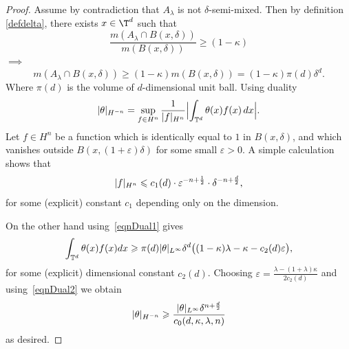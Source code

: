 \documentclass[12pt]{report}   %
\renewcommand{\leq}{\leqslant}
\renewcommand{\geq}{\geqslant}
\numberwithin{equation}{section}
\theoremstyle{plain}
\theoremstyle{definition}
\theoremstyle{remark}
\DeclarePairedDelimiter{\abs}{\lvert}{\rvert}
\DeclarePairedDelimiter{\norm}{|}{|}
\DeclarePairedDelimiter{\paren}{(}{)}
\newcommand{\eps}{{\varepsilon}}
\begin{document}
 \begin{proof}%
    Assume by contradiction that $A_\lambda$ is not $\delta$-semi-mixed.
    Then by definition \ref{defdelta}, there exists $x \in \T^d$ such that
     \[
          \frac{m(A_\lambda \cap B(x,\delta))}{m(B(x,\delta))}
    	\geq (1-\kappa) 
     \]
    $ \implies$
    \begin{equation}\label{eqnDual1}
      m(A_\lambda \cap B(x,\delta))
	\geq (1-\kappa) m(B(x,\delta))
	=(1-\kappa)\pi(d) \delta^d.
    \end{equation}
    Where $\pi(d)$ is the volume of $d$-dimensional unit ball.
Using duality
    \begin{equation}\label{eqnDual2}
      \norm{\theta}_{H^{-n}}
	= \sup_{f\in H^{n}} \frac{1}{\norm{f}_{H^{n}} } \abs[\Big]{\int_{\mathbb{T}^d} \theta(x)f(x) \, dx }.
    \end{equation}
    Let $f \in H^{n}$  be a function which is identically equal to $1$ in $B(x,\delta)$, and which vanishes outside $B(x,(1+\eps)\delta)$ for some small $\eps > 0$.
    A simple calculation shows that 
    \[
      \norm{f}_{H^{n}}\leq c_1(d)\cdot \eps^{-n + \frac{1}{2}}\cdot \delta^{-n + \frac{d}{2}},
    \]
    for some (explicit) constant $c_1$ depending only on the dimension.

    On the other hand using~\eqref{eqnDual1} gives
    \begin{equation}\label{eq:kap}
      \int_{\mathbb{T}^d}\theta(x) f(x) dx
	\geq \pi(d) \norm{\theta}_{L^\infty} \delta^d \paren[\big]{ (1-\kappa) \lambda - \kappa - c_2(d)\eps},
    \end{equation}
    for some (explicit) dimensional constant $c_2(d)$.
    Choosing
    $
      \eps = \frac{\lambda - (1+\lambda)\kappa}{2c_2(d)}
    $
    and using~\eqref{eqnDual2} we obtain
    \[
      \norm{\theta}_{H^{-n}}\geq \frac{\norm{\theta}_{L^\infty} \delta^{n + \frac{d}{2}} }{c_0(d, \kappa, \lambda, n)}
    \]
    as desired.
  \end{proof}%
\end{document}
